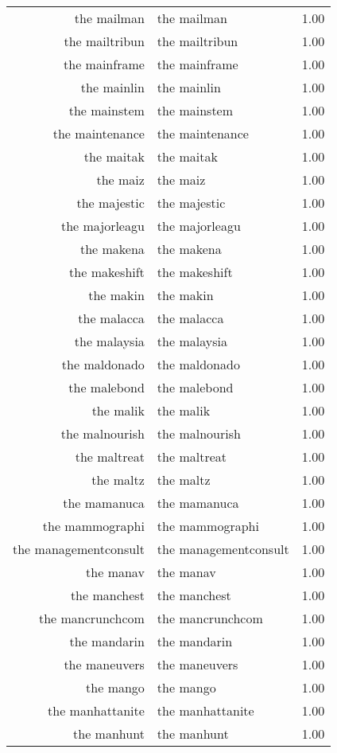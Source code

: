 \begin{table}[ht]
\begin{tabular}{rlr}
  the mailman & the mailman & 1.00 \\ 
  the mailtribun & the mailtribun & 1.00 \\ 
  the mainframe & the mainframe & 1.00 \\ 
  the mainlin & the mainlin & 1.00 \\ 
  the mainstem & the mainstem & 1.00 \\ 
  the maintenance & the maintenance & 1.00 \\ 
  the maitak & the maitak & 1.00 \\ 
  the maiz & the maiz & 1.00 \\ 
  the majestic & the majestic & 1.00 \\ 
  the majorleagu & the majorleagu & 1.00 \\ 
  the makena & the makena & 1.00 \\ 
  the makeshift & the makeshift & 1.00 \\ 
  the makin & the makin & 1.00 \\ 
  the malacca & the malacca & 1.00 \\ 
  the malaysia & the malaysia & 1.00 \\ 
  the maldonado & the maldonado & 1.00 \\ 
  the malebond & the malebond & 1.00 \\ 
  the malik & the malik & 1.00 \\ 
  the malnourish & the malnourish & 1.00 \\ 
  the maltreat & the maltreat & 1.00 \\ 
  the maltz & the maltz & 1.00 \\ 
  the mamanuca & the mamanuca & 1.00 \\ 
  the mammographi & the mammographi & 1.00 \\ 
  the managementconsult & the managementconsult & 1.00 \\ 
  the manav & the manav & 1.00 \\ 
  the manchest & the manchest & 1.00 \\ 
  the mancrunchcom & the mancrunchcom & 1.00 \\ 
  the mandarin & the mandarin & 1.00 \\ 
  the maneuvers & the maneuvers & 1.00 \\ 
  the mango & the mango & 1.00 \\ 
  the manhattanite & the manhattanite & 1.00 \\ 
  the manhunt & the manhunt & 1.00 \\ 

\end{tabular}
\end{table}

